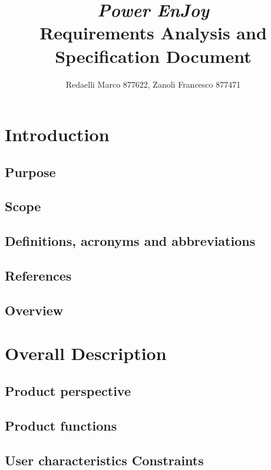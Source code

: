 \documentclass[]{report}
\title{{\Huge\textit{Power EnJoy}}\\{\LARGE Requirements Analysis and Specification Document}}
\author{Redaelli Marco 877622, Zanoli Francesco 877471}
\begin{document}
\maketitle

\tableofcontents

\chapter{Introduction}

\section{Purpose}


\section{Scope}


\section{Definitions, acronyms and abbreviations}


\section{References}


\section{Overview}


\chapter{Overall Description}

\section{Product perspective}
\section{Product functions}
\section{User characteristics Constraints}
\end{document}
